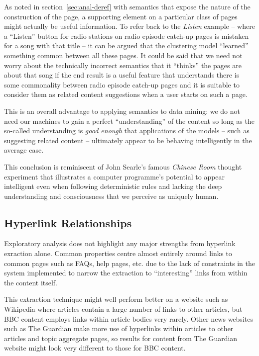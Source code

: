 As noted in section~\ref{sec:anal-deref} with semantics that expose
the nature of the construction of the page, a supporting element on
a particular class of pages might actually be useful information. To
refer back to the \emph{Listen} example -- where a ``Listen'' button
for radio stations on radio episode catch-up pages is mistaken for
a song with that title -- it can be argued that the clustering model
``learned'' something common between all these pages. It could be
said that we need
not worry about the technically incorrect semantics that it ``thinks''
the pages are about that song if the end result is a useful feature
that understands there is some commonality between radio episode
catch-up pages and it is suitable to consider them as related content
suggestions when a user starts on such a page.

This is an overall advantage to applying semantics to data mining:
we do not need our machines to gain a perfect ``understanding'' of
the content so long as the so-called understanding is
\emph{good enough} that applications of the models -- such as
suggesting related content -- ultimately appear to be behaving
intelligently in the average case.

This conclusion is reminiscent of John Searle's famous
\emph{Chinese Room} thought experiment\cite{searle1980minds}
that illustrates a computer
programme's potential to appear intelligent even when following
deterministic rules and lacking the deep understanding and
consciousness that we perceive as uniquely human.

\subsection{Hyperlink Relationships}
\label{sec:anal-hyperlink}

Exploratory analysis does not highlight any major strengths from
hyperlink exraction alone. Common properties centre almost entirely
around links to common pages such as FAQs, help pages, etc. due to the
lack of constraints in the system implemented to narrow the extraction
to ``interesting'' links from within the content itself.

This extraction technique might well perform better on a website
such as Wikipedia where articles contain a large number of links to
other articles, but BBC content employs links within article bodies
very rarely. Other news websites such as The Guardian make more
use of hyperlinks within articles to other articles and topic
aggregate pages, so results for content from The Guardian website
might look very different to those for BBC content.

